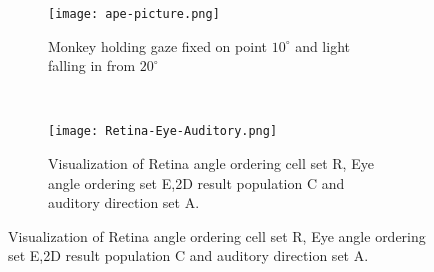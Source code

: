 \documentclass[main]{subfiles}
\begin{document}
\begin{figure}[H]
	\centering
	\begin{subfigure}[b]{0.5\textwidth}
		\centering
		\texttt{[image: ape-picture.png]}
		\caption{Monkey holding gaze fixed on point $10^\circ$ and light falling in from $20^\circ$}
	\end{subfigure}%
	~
	\begin{subfigure}[b]{0.5\textwidth}
		\centering
		\texttt{[image: Retina-Eye-Auditory.png]}
		\caption{Visualization of Retina angle ordering cell set R, Eye angle ordering set E,2D result population C and auditory direction set A.}
		\label{fig:population}
	\end{subfigure}
\end{figure}

%
\end{document}
